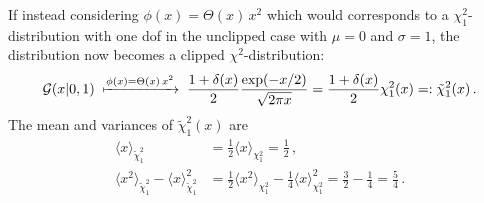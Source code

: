 If instead considering $\phi(x) = \Theta(x) \, x^2$ which would corresponds to a $\chi_1^2$-distribution with one \gls{dof} in the unclipped case with $\mu=0$ and $\sigma=1$, the distribution now becomes a clipped $\chi^2$-distribution:
\begin{equation*}
    \mathcal{G}(x|0, 1) \; \xmapsto{\phi(x) = \Theta(x) \, x^2} \; \frac{1 + \delta(x)}{2} \frac{\exp(-x/2)}{\sqrt{2 \pi x}} = \frac{1 + \delta(x)}{2} \chi_1^2(x) =: \tilde \chi_1^2(x) \,.
\end{equation*}
The mean and variances of $\tilde \chi_1^2(x)$ are
\begin{align}
    \langle x \rangle_{\tilde\chi_1^2} &= \frac{1}{2} \langle x \rangle_{\chi_1^2} = \frac{1}{2} \,, \label{eq:apdx_clipchisq_mean} \\
    \langle x^2 \rangle_{\tilde\chi_1^2} - \langle x \rangle_{\tilde\chi_1^2}^2 &= \frac{1}{2} \langle x^2 \rangle_{\chi_1^2} - \frac{1}{4} \langle x \rangle_{\chi_1^2}^2 = \frac{3}{2} - \frac{1}{4} = \frac{5}{4} \,. \label{eq:apdx_clipchisq_std}
\end{align}
